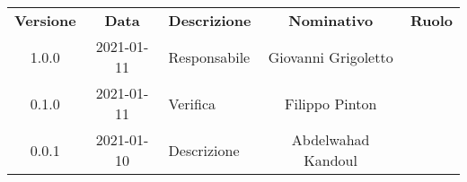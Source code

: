 {
    \renewcommand{\arraystretch}{1.5}
    \centering
    \begin{longtable}{ c c  C{4cm}  c  c }
        \rowcolor{\primaryColor}
        \textcolor{\secondaryColor}{
        \textbf{Versione}}     & \textcolor{\secondaryColor}{\textbf{Data}}       & \textcolor{\secondaryColor}
        {\textbf{Descrizione}} & \textcolor{\secondaryColor}{\textbf{Nominativo}} & \textcolor{\secondaryColor}{\textbf{Ruolo}}                          \\


        1.0.0                  & 2021-01-11                                       & Responsabile                                & Giovanni Grigoletto & \responsabile{} \\
        0.1.0                  & 2021-01-11                                       & Verifica                                    & Filippo Pinton & \verificatore{} \\
        0.0.1                  & 2021-01-10                                       & Descrizione                            & Abdelwahad Kandoul & \redattore{}    \\
    \end{longtable}
}